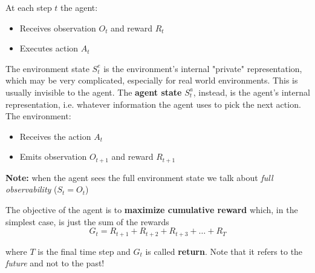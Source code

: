 At each step $t$ the agent:
\begin{itemize}
    \item Receives observation $O_t$ and reward $R_t$
    \item Executes action $A_t$
\end{itemize}

\begin{center}
\end{center}

The environment state $S_t^e$ is the environment's internal "private" representation, which may be very complicated, especially for real world environments. This is usually invisible to the agent. The \textbf{agent state} $S_t^a$, instead, is the agent's internal representation, i.e. whatever information the agent uses to pick the next action.
The environment:
\begin{itemize}
    \item Receives the action $A_t$
    \item Emits observation $O_{t+1}$ and reward $R_{t+1}$
\end{itemize}

\noindent
\textbf{Note:} when the agent sees the full environment state we talk about \textit{full observability} ($S_t = O_t$)

\noindent
The objective of the agent is to \textbf{maximize cumulative reward} which, in the simplest case, is just the sum of the rewards
\[
    G_t = R_{t+1} + R_{t+2} + R_{t+3} + \dots + R_{T}
\]

where $T$ is the final time step and $G_t$ is called \textbf{return}. Note that it refers to the \textit{future} and not to the past!

